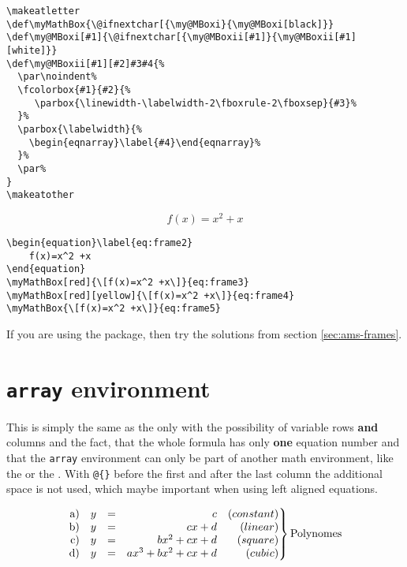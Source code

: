 \begin{lstlisting}
\makeatletter
\def\myMathBox{\@ifnextchar[{\my@MBoxi}{\my@MBoxi[black]}}
\def\my@MBoxi[#1]{\@ifnextchar[{\my@MBoxii[#1]}{\my@MBoxii[#1][white]}}
\def\my@MBoxii[#1][#2]#3#4{%
  \par\noindent%
  \fcolorbox{#1}{#2}{%
     \parbox{\linewidth-\labelwidth-2\fboxrule-2\fboxsep}{#3}%
  }%
  \parbox{\labelwidth}{%
    \begin{eqnarray}\label{#4}\end{eqnarray}%
  }%
  \par%
}
\makeatother
\end{lstlisting}

\begin{equation}\label{eq:frame2}
	f(x)=x^2 +x
\end{equation}

\medskip
\begin{lstlisting}
\begin{equation}\label{eq:frame2}
	f(x)=x^2 +x
\end{equation}
\myMathBox[red]{\[f(x)=x^2 +x\]}{eq:frame3}
\myMathBox[red][yellow]{\[f(x)=x^2 +x\]}{eq:frame4}
\myMathBox{\[f(x)=x^2 +x\]}{eq:frame5}
\end{lstlisting}

If you are using the \AmSmath package, then try the solutions from section
\vref{sec:ams-frames}.

\section{\texttt{array} environment}
This is simply the same as the  only with the
possibility of variable rows \textbf{and} columns and the fact, that
the whole formula has only \textbf{one} equation number and that the
\verb|array| environment can only be part of another math environment,
like the  or the . With \verb+@{}+ before the
first and after the last column the additional space 
is not used, which maybe important when using left aligned equations.

\begin{equation}
\left.%
\begin{array}{@{}r@{\quad}ccrr@{}}
	\textrm{a}) & y & = & c & (constant)\\
	\textrm{b}) & y & = & cx+d & (linear)\\
	\textrm{c}) & y & = & bx^{2}+cx+d & (square)\\
	\textrm{d}) & y & = & ax^{3}+bx^{2}+cx+d & (cubic)
\end{array}%
\right\} 	\textrm{Polynomes}
\end{equation}


